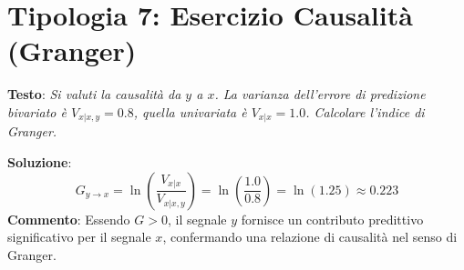 \documentclass[10pt, letterpaper]{report}
\begin{document}
\section*{Tipologia 7: Esercizio Causalità (Granger)}
\textbf{Testo}: \emph{Si valuti la causalità da $y$ a $x$. La varianza dell'errore di predizione bivariato è $V_{x|x,y} = 0.8$, quella univariata è $V_{x|x} = 1.0$. Calcolare l'indice di Granger.}

\textbf{Soluzione}:
\[
G_{y \to x} = \ln\left( \frac{V_{x|x}}{V_{x|x,y}} \right) = \ln\left( \frac{1.0}{0.8} \right) = \ln(1.25) \approx 0.223
\]
\textbf{Commento}: Essendo $G > 0$, il segnale $y$ fornisce un contributo predittivo significativo per il segnale $x$, confermando una relazione di causalità nel senso di Granger.
\end{document}
